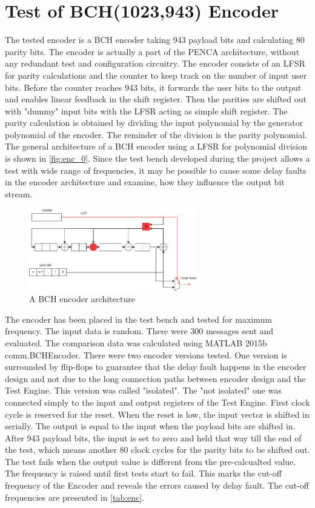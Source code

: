 \section{Test of BCH(1023,943) Encoder}
The tested encoder is a BCH encoder taking 943 payload bits and calculating 80 parity bits. The encoder is actually a part of the PENCA architecture, without any redundant test and configuration circuitry. The encoder consists of an LFSR for parity calculations and the counter to keep track on the number of input user bits. Before the counter reaches 943 bits, it forwards the user bits to the output and enables linear feedback in the shift register. Then the parities are shifted out with "dummy" input bits with the LFSR acting as simple shift register. The parity calculation is obtained by dividing the input polynomial by the generator polynomial of the encoder. The reminder of the division is the parity polynomial. The general architecture of a BCH encoder using a LFSR for polynomial division is shown in \autoref{fig:enc_0}. Since the test bench developed during the project allows a test with wide range of frequencies, it may be possible to cause some delay faults in the encoder architecture and examine, how they influence the output bit stream.

\begin{figure}[h]
\centering
\includegraphics[width=0.65\textwidth]{figures/BCH_ENC.png}
\caption{A BCH encoder architecture \cite{art:BCH_implement}}
\label{fig:enc_0}
\end{figure}

The encoder has been placed in the test bench and tested for maximum frequency. The input data is random. There were 300 messages sent and evaluated. The comparison data was calculated using MATLAB 2015b comm.BCHEncoder. There were two encoder versions tested. One version is surrounded by flip-flops to guarantee that the delay fault happens in the encoder design and not due to the long connection paths between encoder design and the Test Engine. This version was called "isolated". The "not isolated" one was connected simply to the input and output registers of the Test Engine. First clock cycle is reserved for the reset. When the reset is low, the input vector is shifted in serially. The output is equal to the input when the payload bits are shifted in. After 943 payload bits, the input is set to zero and held that way till the end of the test, which means another 80 clock cycles for the parity bits to be shifted out. The test fails when the output value is different from the pre-calcualted value. The frequency is raised until first tests start to fail. This marks the cut-off frequency of the Encoder and reveals the errors caused by delay fault. The cut-off frequencies are presented in \autoref{tab:enc}.

